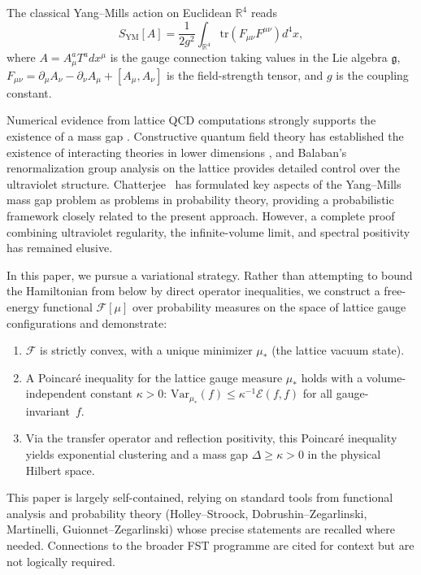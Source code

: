 \documentclass[12pt,a4paper]{article}
\theoremstyle{definition}
\theoremstyle{plain}
\theoremstyle{remark}
\begin{document}
The classical Yang--Mills action on Euclidean $\mathbb{R}^4$ reads
\begin{equation}\label{eq:YM-action}
    S_{\mathrm{YM}}[A] = \frac{1}{2g^2} \int_{\mathbb{R}^4} \mathrm{tr}\left( F_{\mu\nu} F^{\mu\nu} \right) d^4x,
\end{equation}
where $A = A_\mu^a T^a dx^\mu$ is the gauge connection taking values in the Lie algebra $\mathfrak{g}$, $F_{\mu\nu} = \partial_\mu A_\nu - \partial_\nu A_\mu + [A_\mu, A_\nu]$ is the field-strength tensor, and $g$ is the coupling constant.

Numerical evidence from lattice QCD computations strongly supports the existence of a mass gap \cite{Wilson1974, CreutzJacobsRebbi1983}. Constructive quantum field theory has established the existence of interacting theories in lower dimensions \cite{GlimmJaffe1987}, and Balaban's renormalization group analysis on the lattice \cite{Balaban1985a, Balaban1985b, Balaban1984c} provides detailed control over the ultraviolet structure. Chatterjee~\cite{Chatterjee2018} has formulated key aspects of the Yang--Mills mass gap problem as problems in probability theory, providing a probabilistic framework closely related to the present approach. However, a complete proof combining ultraviolet regularity, the infinite-volume limit, and spectral positivity has remained elusive.

In this paper, we pursue a variational strategy. Rather than attempting to bound the Hamiltonian from below by direct operator inequalities, we construct a free-energy functional $\mathcal{F}[\mu]$ over probability measures on the space of lattice gauge configurations and demonstrate:
\begin{enumerate}
    \item $\mathcal{F}$ is strictly convex, with a unique minimizer $\mu_*$ (the lattice vacuum state).
    \item A Poincar\'e inequality for the lattice gauge measure $\mu_*$ holds with a volume-independent constant $\kappa > 0$: $\mathrm{Var}_{\mu_*}(f) \leq \kappa^{-1} \mathcal{E}(f,f)$ for all gauge-invariant~$f$.
    \item Via the transfer operator and reflection positivity, this Poincar\'e inequality yields exponential clustering and a mass gap $\Delta \geq \kappa > 0$ in the physical Hilbert space.
\end{enumerate}

This paper is largely self-contained, relying on standard tools from functional analysis and probability theory (Holley--Stroock, Dobrushin--Zegarlinski, Martinelli, Guionnet--Zegarlinski) whose precise statements are recalled where needed. Connections to the broader FST programme are cited for context but are not logically required.
\end{document}
